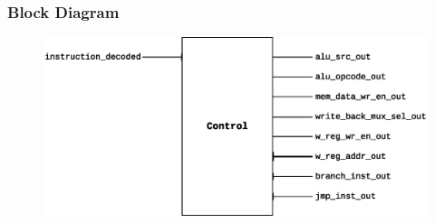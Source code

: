 \documentclass{article}
\begin{document}
     \subsubsection{Block Diagram}
  \begin{figure}[H]
    \centering
    \includegraphics[width=\linewidth]{pictures/blocks/control_block.eps}
  \end{figure}  
  
\end{document}
